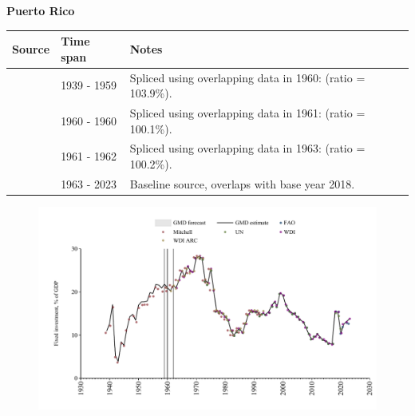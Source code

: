 \documentclass[12pt,a4paper,landscape]{article}
\begin{document}
\begin{adjustbox}{max totalsize={\paperwidth}{\paperheight},center}
\begin{minipage}[t][\textheight][t]{\textwidth}
\vspace*{0.5cm}
{}
\begin{center}
{\Large\bfseries Puerto Rico}
\end{center}
\vspace{0.5cm}
\begin{table}[H]
\centering
\small
\begin{tabular}{|l|l|l|}
\hline
\textbf{Source} & \textbf{Time span} & \textbf{Notes} \\
\hline
\rowcolor{white}\cite{Mitchell}& 1939 - 1959 &Spliced using overlapping data in 1960: (ratio = 103.9\%).\\
\rowcolor{lightgray}\cite{WDI}& 1960 - 1960 &Spliced using overlapping data in 1961: (ratio = 100.1\%).\\
\rowcolor{white}\cite{WDI_ARC}& 1961 - 1962 &Spliced using overlapping data in 1963: (ratio = 100.2\%).\\
\rowcolor{lightgray}\cite{WDI}& 1963 - 2023 &Baseline source, overlaps with base year 2018.\\
\hline
\end{tabular}
\end{table}
\begin{figure}[H]
\centering
\includegraphics[width=\textwidth,height=0.6\textheight,keepaspectratio]{graphs/PRI_finv_GDP.pdf}
\end{figure}
\end{minipage}
\end{adjustbox}
\end{document}
